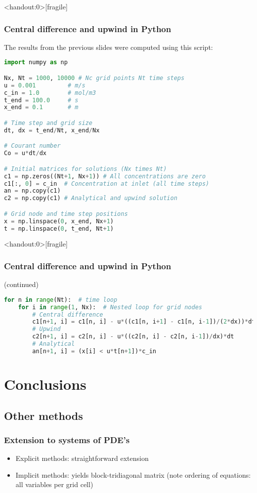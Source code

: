 \begin{frame}<handout:0>[fragile]
  \frametitle{Central difference and upwind in Python}
  \footnotesize\selectfont
  The results from the previous slides were computed using this script:
  \begin{lstlisting}[language=Python, basicstyle=\scriptsize]
import numpy as np

Nx, Nt = 1000, 10000 # Nc grid points Nt time steps
u = 0.001         # m/s
c_in = 1.0        # mol/m3
t_end = 100.0     # s
x_end = 0.1       # m

# Time step and grid size
dt, dx = t_end/Nt, x_end/Nx

# Courant number
Co = u*dt/dx

# Initial matrices for solutions (Nx times Nt)
c1 = np.zeros((Nt+1, Nx+1)) # All concentrations are zero
c1[:, 0] = c_in  # Concentration at inlet (all time steps)
an = np.copy(c1) 
c2 = np.copy(c1) # Analytical and upwind solution

# Grid node and time step positions
x = np.linspace(0, x_end, Nx+1)
t = np.linspace(0, t_end, Nt+1)
\end{lstlisting}
\end{frame}

\begin{frame}<handout:0>[fragile]
  \frametitle{Central difference and upwind in Python}
  \footnotesize\selectfont
  (continued)
\begin{lstlisting}[language=Python, basicstyle=\scriptsize]
for n in range(Nt):  # time loop
    for i in range(1, Nx):  # Nested loop for grid nodes
        # Central difference
        c1[n+1, i] = c1[n, i] - u*((c1[n, i+1] - c1[n, i-1])/(2*dx))*dt
        # Upwind
        c2[n+1, i] = c2[n, i] - u*((c2[n, i] - c2[n, i-1])/dx)*dt
        # Analytical
        an[n+1, i] = (x[i] < u*t[n+1])*c_in
\end{lstlisting}
\end{frame}


\section{Conclusions}
\subsection{Other methods}
\begin{frame}
  \frametitle{Extension to systems of PDE's}
  \begin{itemize}
    \item Explicit methods: straightforward extension
    \item Implicit methods: yields block-tridiagonal matrix (note ordering of equations: all variables per grid cell)
  \end{itemize}
\end{frame}

